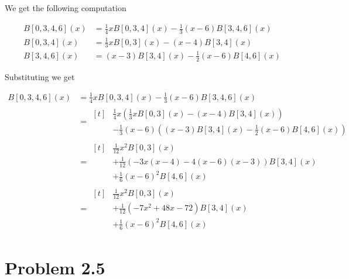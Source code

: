\documentclass{article}
\begin{document}
We get the following computation

\begin{equation*}
\begin{aligned}
    B[0,3,4,6](x)
    &= \frac 1 4 x B[0,3,4](x) - \frac 1 3 (x - 6) B[3,4,6](x)\\
    B[0,3,4](x)
    &= \frac 1 3 x B[0,3](x) - (x - 4) B[3,4](x)\\
    B[3,4,6](x)
    &= (x - 3) B[3,4](x) - \frac 1 2 (x - 6) B[4,6](x)
\end{aligned}
\end{equation*}

Substituting we get

\begin{equation*}
\begin{aligned}
    B[0,3,4,6](x)
    &= \frac 1 4 x B[0,3,4](x) - \frac 1 3 (x - 6) B[3,4,6](x)\\
    &=\begin{aligned}[t]
        &\frac 1 4 x \left(\frac 1 3 x B[0,3](x) - (x - 4) B[3,4](x)\right)\\
        &- \frac 1 3 (x - 6) \left((x - 3)B[3,4](x) - \frac 1 2 (x - 6) B[4,6](x)\right)
    \end{aligned}\\
    &=\begin{aligned}[t]
        &\frac 1 {12} x^2 B[0,3](x)\\
        &+ \frac 1 {12} \left(- 3x(x - 4) - 4(x - 6)(x - 3)\right)B[3,4](x)\\
        &+ \frac 1 6 (x - 6)^2 B[4,6](x)
    \end{aligned}\\
    &=\begin{aligned}[t]
        &\frac 1 {12} x^2 B[0,3](x)\\
        &+ \frac 1 {12} \left(-7x^2 + 48x - 72\right)B[3,4](x)\\
        &+ \frac 1 6 (x - 6)^2 B[4,6](x)
    \end{aligned}
\end{aligned}
\end{equation*}

\section*{Problem 2.5}
\end{document}
